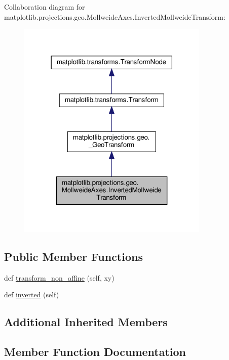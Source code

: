 Collaboration diagram for matplotlib.\+projections.\+geo.\+Mollweide\+Axes.\+Inverted\+Mollweide\+Transform\+:
\nopagebreak
\begin{figure}[H]
\begin{center}
\leavevmode
\includegraphics[width=259pt]{classmatplotlib_1_1projections_1_1geo_1_1MollweideAxes_1_1InvertedMollweideTransform__coll__graph}
\end{center}
\end{figure}
\subsection*{Public Member Functions}
\begin{DoxyCompactItemize}
\item 
def \hyperlink{classmatplotlib_1_1projections_1_1geo_1_1MollweideAxes_1_1InvertedMollweideTransform_ab9464fba71ca3d5e0eb2787232d17974}{transform\+\_\+non\+\_\+affine} (self, xy)
\item 
def \hyperlink{classmatplotlib_1_1projections_1_1geo_1_1MollweideAxes_1_1InvertedMollweideTransform_a8062f27f4ed6163d54b7e680d97c0486}{inverted} (self)
\end{DoxyCompactItemize}
\subsection*{Additional Inherited Members}


\subsection{Member Function Documentation}
\mbox{\label{classmatplotlib_1_1projections_1_1geo_1_1MollweideAxes_1_1InvertedMollweideTransform_a8062f27f4ed6163d54b7e680d97c0486}} 
